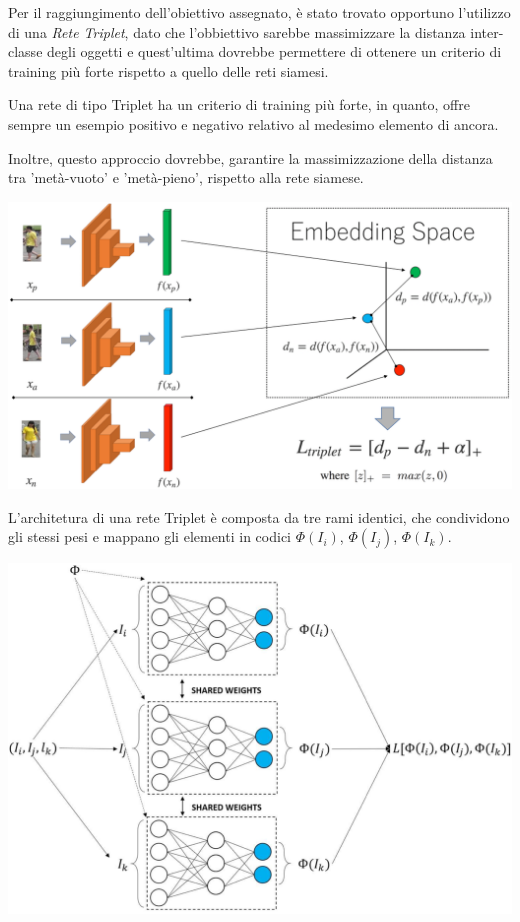 \documentclass[11pt]{article}
\begin{document}
Per il raggiungimento dell'obiettivo assegnato, è stato trovato opportuno
l'utilizzo di una \textit{Rete Triplet}, dato che l'obbiettivo sarebbe massimizzare la distanza inter-classe degli oggetti
e quest'ultima dovrebbe permettere di ottenere un criterio di training più forte rispetto a quello
delle reti siamesi.

Una rete di tipo Triplet ha un criterio di training più forte, in quanto, offre
sempre un esempio positivo e negativo relativo
al medesimo elemento di ancora. 

Inoltre, questo approccio dovrebbe, garantire la massimizzazione della distanza
tra 'metà-vuoto' e 'metà-pieno', rispetto alla rete siamese.

\begin{center}
    \begin{minipage}{0.6\linewidth}
    \includegraphics[width=\linewidth]{01.png}
    \end{minipage}
\end{center}

L'architetura di una rete Triplet è composta da tre rami identici, che condividono gli stessi pesi e mappano gli elementi in codici $\Phi(I_i)$, $\Phi(I_j)$, $\Phi(I_k)$.

\begin{center}
    \begin{minipage}{0.5\linewidth}
    \includegraphics[width=\linewidth]{02.png}
    \end{minipage}
\end{center}
\end{document}
